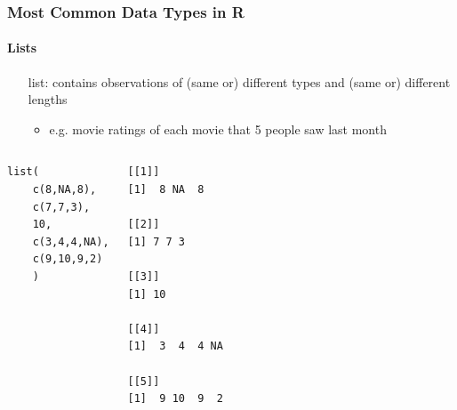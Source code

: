 \begin{frame}[fragile]
	\frametitle{Most Common Data Types in R}
	\framesubtitle{Lists}

	\begin{itemize}
		\item[list:] contains observations of (same or) different types and (same or) different lengths
			\begin{itemize}
				\item e.g. movie ratings of each movie that 5 people saw last month 
			\end{itemize}
		\end{itemize}

   \begin{columns}
		\begin{lstlisting}
list(
	c(8,NA,8),
	c(7,7,3),
	10,
	c(3,4,4,NA),
	c(9,10,9,2)
	)
		\end{lstlisting}

      \begin{center}
{ \tiny
				\begin{verbatim} 
[[1]]
[1]  8 NA  8

[[2]]
[1] 7 7 3

[[3]]
[1] 10

[[4]]
[1]  3  4  4 NA

[[5]]
[1]  9 10  9  2
			\end{verbatim} \normalsize
}
       \end{center}
     \end{columns}

\end{frame}


